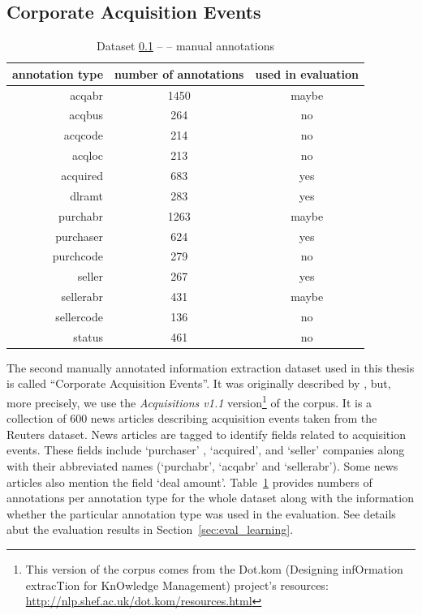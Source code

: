 \subsection{Corporate Acquisition Events} \label{sec:ch40_corporate_acquisitions}

\begin{table}
\centering
\begin{tabular}{|r||c|c|}
\hline
\textbf{annotation type} & \textbf{number of annotations} & \textbf{used in evaluation}\\
\hline
\hline
acqabr & 1450 & maybe\\
\hline
acqbus & 264 & no\\
\hline
acqcode & 214 & no\\
\hline
acqloc & 213 & no\\
\hline
acquired & 683 & yes\\
\hline
dlramt & 283 & yes\\
\hline
purchabr & 1263 & maybe\\
\hline
purchaser & 624 & yes\\
\hline
purchcode & 279 & no\\
\hline
seller & 267 & yes\\
\hline
sellerabr & 431 & maybe\\
\hline
sellercode & 136 & no\\
\hline
status & 461 & no\\
\hline
\end{tabular}
\caption{Dataset \ref{sec:ch40_corporate_acquisitions} --  -- manual annotations} \label{tab:ch40_acquisitions}
\end{table}


The second manually annotated information extraction dataset used in this thesis is called ``Corporate Acquisition Events''. It was originally described by \cite{lewis1992representation}, but, more precisely, we use the \emph{Acquisitions v1.1} version\footnote{This version of the corpus comes from the Dot.kom (Designing infOrmation extracTion for KnOwledge Management) project's resources: \url{http://nlp.shef.ac.uk/dot.kom/resources.html}} of the corpus.
It is a collection of 600 news articles describing acquisition
events taken from the Reuters dataset. News articles are tagged to identify fields
related to acquisition events. These fields include `purchaser' , `acquired', and
`seller' companies along with their abbreviated names (`purchabr', `acqabr' and
`sellerabr'). Some news articles also mention the field `deal amount'. 
Table~\ref{tab:ch40_acquisitions} provides numbers of annotations per annotation type for the whole dataset along with the information whether the particular annotation type was used in the evaluation. See details abut the evaluation results in Section~\ref{sec:eval_learning}. 




